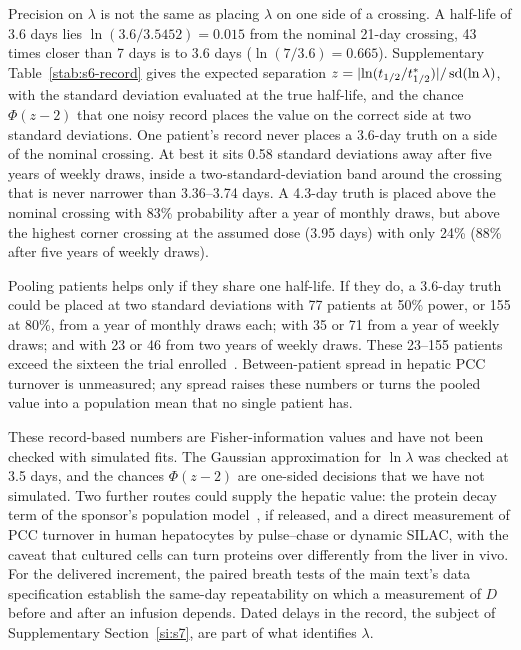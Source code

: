 Precision on $\lambda$ is not the same as placing $\lambda$ on one side of a crossing. A half-life of
3.6 days lies $\ln(3.6/3.5452)=0.015$ from the nominal 21-day crossing, 43 times closer than 7 days
is to 3.6 days ($\ln(7/3.6)=0.665$). Supplementary Table~\ref{stab:s6-record} gives the expected
separation $z=\lvert\ln(t_{1/2}/t_{1/2}^{\ast})\rvert/\operatorname{sd}(\ln \lambda)$, with the standard deviation
evaluated at the true half-life, and the chance $\Phi(z-2)$ that one noisy record places the value
on the correct side at two standard deviations. One patient's record never places a 3.6-day truth
on a side of the nominal crossing. At best it sits 0.58 standard deviations away after five years of
weekly draws, inside a two-standard-deviation band around the crossing that is never narrower than
3.36--3.74 days. A 4.3-day truth is placed above the nominal crossing with 83\% probability after a
year of monthly draws, but above the highest corner crossing at the assumed dose (3.95 days) with
only 24\% (88\% after five years of weekly draws).

Pooling patients helps only if they share one half-life. If they do, a 3.6-day truth could be placed
at two standard deviations with 77 patients at 50\% power, or 155 at 80\%, from a year of monthly
draws each; with 35 or 71 from a year of weekly draws; and with 23 or 46 from two years of weekly
draws. These 23--155 patients exceed the sixteen the trial enrolled~\cite{trial_phase12}. Between-patient
spread in hepatic PCC turnover is unmeasured; any spread raises these numbers or turns the pooled
value into a population mean that no single patient has.

These record-based numbers are Fisher-information values and have not been checked with
simulated fits. The Gaussian
approximation for $\ln\lambda$ was checked at 3.5 days, and the chances $\Phi(z-2)$ are one-sided
decisions that we have not simulated. Two further routes could supply the hepatic value: the protein
decay term of the sponsor's population model~\cite{gao2025acop}, if released, and a direct measurement
of PCC turnover in human hepatocytes by pulse--chase or dynamic SILAC, with the caveat that cultured
cells can turn proteins over differently from the liver in vivo. For the delivered increment, the
paired breath tests of the main text's data specification establish the same-day repeatability on
which a measurement of $D$ before and after an infusion depends. Dated delays in the record, the
subject of Supplementary Section~\ref{si:s7}, are part of what identifies $\lambda$.

